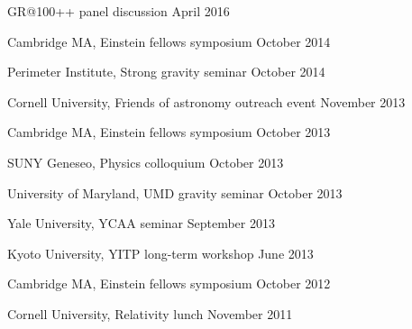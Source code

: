 \begin{etaremune}
  GR@100++ panel discussion
  \hfill{}
  April 2016
\item
  Cambridge MA,
  Einstein fellows symposium
  \hfill{}
  October 2014
\item
  Perimeter Institute,
  Strong gravity seminar
  \hfill{}
  October 2014
\item
  Cornell University,
  Friends of astronomy outreach event
  \hfill{}
  November 2013
\item
  Cambridge MA,
  Einstein fellows symposium
  \hfill{}
  October 2013
\item
  SUNY Geneseo,
  Physics colloquium
  \hfill{}
  October 2013
\item
  University of Maryland,
  UMD gravity seminar
  \hfill{}
  October 2013
\item
  Yale University,
  YCAA seminar
  \hfill{}
  September 2013
\item
  Kyoto University,
  YITP long-term workshop
  \hfill{}
  June 2013
\item
  Cambridge MA,
  Einstein fellows symposium
  \hfill{}
  October 2012
\item
  Cornell University,
  Relativity lunch
  \hfill{}
  November 2011
\end{etaremune}

